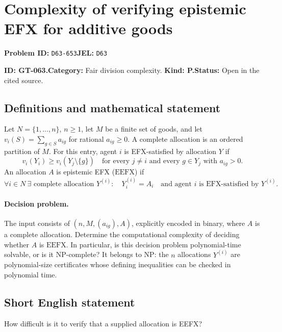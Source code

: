 \documentclass[11pt,a4paper]{article}
\begin{document}
\section*{Complexity of verifying epistemic EFX for additive goods}
\textbf{Problem ID:} \texttt{D63-653}\quad \textbf{JEL:} \texttt{D63}\par
\label{problem:OP-0193}
\label{game:GT-063}
{\sffamily\small\color{muted}
\noindent\textbf{ID: GT-063.}\quad\textbf{Category:} Fair division complexity.
\quad\textbf{Kind: P.}\quad\textbf{Status:} Open in the cited source.
\par}
\subsection*{Definitions and mathematical statement}
Let \(N=\{1,\ldots,n\}\), \(n\geq1\), let \(M\) be a finite set of goods, and let
\(v_i(S)=\sum_{g\in S}a_{ig}\) for rational \(a_{ig}\geq 0\).
A complete allocation is an ordered partition of \(M\).
For this entry, agent \(i\) is EFX-satisfied by allocation \(Y\) if
\[
 v_i(Y_i)\geq v_i(Y_j\setminus\{g\})
 \quad
 \text{for every }j\ne i
 \text{ and every }g\in Y_j\text{ with }a_{ig}>0.
\]
An allocation \(A\) is epistemic EFX (\(\mathrm{EEFX}\)) if
\[
 \forall i\in N\ \exists\text{ complete allocation }Y^{(i)}:
 \quad Y^{(i)}_i=A_i
 \quad\text{and agent }i\text{ is EFX-satisfied by }Y^{(i)}.
\]

\paragraph{Decision problem.}
The input consists of \((n,M,(a_{ig}),A)\), explicitly encoded in binary,
where \(A\) is a complete allocation. Determine the computational
complexity of deciding whether \(A\) is \(\mathrm{EEFX}\).
In particular, is this decision problem polynomial-time solvable,
or is it NP-complete? It belongs to NP: the \(n\) allocations \(Y^{(i)}\)
are polynomial-size certificates whose defining inequalities can be
checked in polynomial time.

\subsection*{Short English statement}
How difficult is it to verify that a supplied allocation is EEFX?
\end{document}
